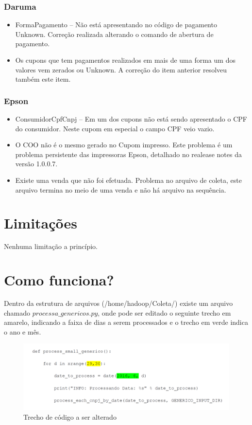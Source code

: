 \documentclass{article}      %
\begin{document}
\subsubsection{Daruma}
\begin{itemize}
\item FormaPagamento – Não está apresentando no código de pagamento Unknown. Correção realizada alterando o comando de abertura de pagamento.
\item Os cupons que tem pagamentos realizados em mais de uma forma um dos valores vem zerados ou Unknown. A correção do item anterior resolveu também este item.
\end{itemize}

\subsubsection{Epson}
\begin{itemize}
\item ConsumidorCpfCnpj – Em um dos cupons não está sendo apresentado o CPF do consumidor. Neste cupom em especial o campo CPF veio vazio.
\item O COO não é o mesmo gerado no Cupom impresso. Este problema é um problema persistente das impressoras Epson, detalhado no realease notes da versão 1.0.0.7.
\item Existe uma venda que não foi efetuada. Problema no arquivo de coleta, este arquivo termina no meio de uma venda e não há arquivo na sequência.
\end{itemize}

\section{Limitações}
Nenhuma limitação a princípio.

\section{Como funciona?}

Dentro da estrutura de arquivos (/home/hadoop/Coleta/) existe um arquivo chamado $processa\_genericos.py$, onde pode ser editado o seguinte trecho em amarelo, indicando a faixa de dias a serem processados e o trecho em verde indica o ano e mês.

\begin{figure}[!ht]
  \centering
    \includegraphics[width=1.0\textwidth]{genericos.png}
  \caption{Trecho de código a ser alterado}
    \label{fig:genericos}
\end{figure}
\end{document}
